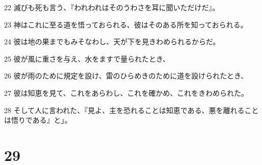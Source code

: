 \par 22 滅びも死も言う、『われわれはそのうわさを耳に聞いただけだ』。
\par 23 神はこれに至る道を悟っておられる、彼はそのある所を知っておられる。
\par 24 彼は地の果までもみそなわし、天が下を見きわめられるからだ。
\par 25 彼が風に重さを与え、水をますで量られたとき、
\par 26 彼が雨のために規定を設け、雷のひらめきのために道を設けられたとき、
\par 27 彼は知恵を見て、これをあらわし、これを確かめ、これをきわめられた。
\par 28 そして人に言われた、『見よ、主を恐れることは知恵である、悪を離れることは悟りである』と」。

\chapter{29}

